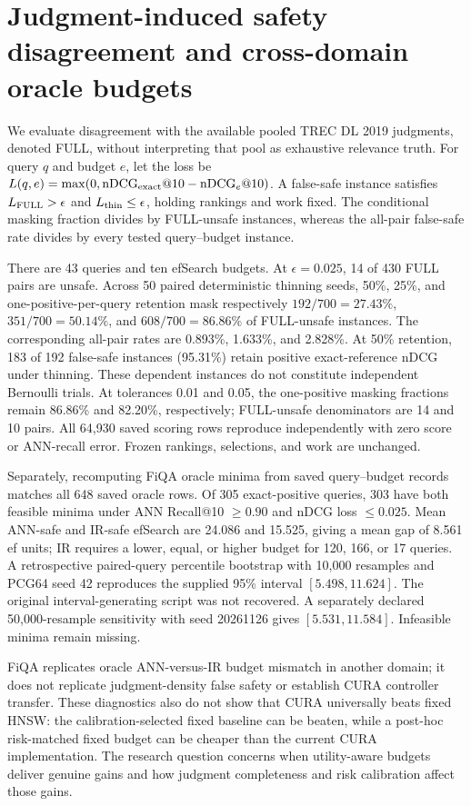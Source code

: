 \section{Judgment-induced safety disagreement and cross-domain oracle budgets}

We evaluate disagreement with the available pooled TREC DL 2019 judgments,
denoted FULL, without interpreting that pool as exhaustive relevance truth.
For query $q$ and budget $e$, let the loss be
$L(q,e)=\max(0,\mathrm{nDCG}_{\rm exact}@10-\mathrm{nDCG}_{e}@10)$.
A false-safe instance satisfies $L_{\rm FULL}>\epsilon$ and
$L_{\rm thin}\leq\epsilon$, holding rankings and work fixed.
The conditional masking fraction divides by FULL-unsafe instances, whereas
the all-pair false-safe rate divides by every tested query--budget instance.

There are 43 queries and ten efSearch budgets. At $\epsilon=0.025$,
14 of 430 FULL pairs are unsafe. Across 50 paired deterministic thinning
seeds, 50\%, 25\%, and one-positive-per-query retention mask respectively
$192/700=27.43\%$, $351/700=50.14\%$, and $608/700=86.86\%$ of
FULL-unsafe instances. The corresponding all-pair rates are 0.893\%,
1.633\%, and 2.828\%. At 50\% retention, 183 of 192 false-safe instances
(95.31\%) retain positive exact-reference nDCG under thinning. These
dependent instances do not constitute independent Bernoulli trials.
At tolerances 0.01 and 0.05, the one-positive masking fractions remain
86.86\% and 82.20\%, respectively; FULL-unsafe denominators are 14 and 10
pairs. All 64,930 saved scoring rows reproduce independently with zero
score or ANN-recall error. Frozen rankings, selections, and work are unchanged.

Separately, recomputing FiQA oracle minima from saved query--budget records
matches all 648 saved oracle rows. Of 305 exact-positive queries, 303 have
both feasible minima under ANN Recall@10 $\geq0.90$ and nDCG loss
$\leq0.025$. Mean ANN-safe and IR-safe efSearch are 24.086 and 15.525,
giving a mean gap of 8.561 ef units; IR requires a lower, equal, or higher
budget for 120, 166, or 17 queries. A retrospective paired-query percentile
bootstrap with 10,000 resamples and PCG64 seed 42 reproduces the supplied
95\% interval $[5.498,11.624]$. The original interval-generating script was
not recovered. A separately declared 50,000-resample sensitivity with seed
20261126 gives $[5.531,11.584]$. Infeasible minima remain missing.

FiQA replicates oracle ANN-versus-IR budget mismatch in another domain;
it does not replicate judgment-density false safety or establish CURA
controller transfer. These diagnostics also do not show that CURA universally
beats fixed HNSW: the calibration-selected fixed baseline can be beaten,
while a post-hoc risk-matched fixed budget can be cheaper than the current
CURA implementation. The research question concerns when utility-aware
budgets deliver genuine gains and how judgment completeness and risk
calibration affect those gains.
